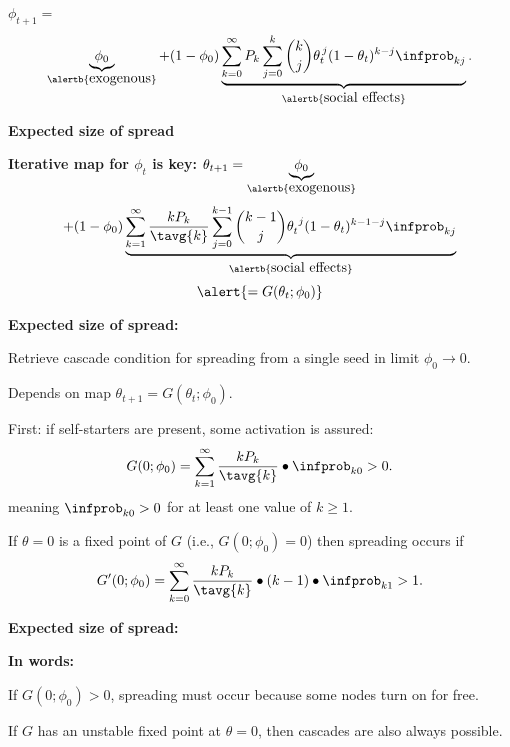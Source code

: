 {{{{      $ 
      \phi_{t+1}
      = 
      $
      $$
      \underbrace{\phi_0}_{\alertb{\mbox{exogenous}}} 
      + 
      (1-\phi_{0})
      \underbrace{
      \sum_{k=0}^{\infty}
      P_k
      \sum_{j=0}^{k}
      \binom{k}{j}
      \theta_t^{\, j}
      (1-\theta_t)^{k-j} 
      \infprob_{kj}
      }_{\alertb{\mbox{social effects}}}.
      $$
    
  


  \textbf{Expected size of spread}
  
  \textbf{Iterative map for $\phi_t$ is key:}
      $
      \theta_{t+1}
      =
      \underbrace{\phi_0}_{\alertb{\mbox{exogenous}}} 
      $
      $$
      +
      (1-\phi_0)
      \underbrace{
      \sum_{k=1}^{\infty}
      \frac{k P_k}{\tavg{k}}
      \sum_{j=0}^{k-1}
      \binom{k-1}{j}
      \theta_{t}^{\ j}
      (1-\theta_{t})^{k-1-j}
      \infprob_{kj}
      }_{\alertb{\mbox{social effects}}}
      $$
      $$
      \alert{= G(\theta_t;\phi_0)}
      $$
  



  \textbf{Expected size of spread:}

  
    
    
      Retrieve cascade condition for 
      spreading from a single seed in limit $\phi_0 \rightarrow 0$.
     
      Depends on map $\theta_{t+1} = G(\theta_{t};\phi_0)$.
     
      First: if self-starters are present, some activation is assured:
      $$
      G(0;\phi_0) = 
      \sum_{k=1}^{\infty} 
      \frac{kP_k}{\tavg{k}}
      \bullet
      \infprob_{k0} > 0.
      $$
      meaning $\infprob_{k0}>0$ for at least one value of $k \ge 1$.
     
      If $\theta=0$ is a fixed point of $G$ (i.e., $G(0;\phi_0) = 0$)
      then spreading occurs if
      $$
      G'(0;\phi_0) = 
      \sum_{k=0}^{\infty} 
      \frac{k P_k}{\tavg{k}}
      \bullet
      (k-1) 
      \bullet
      \infprob_{k1} > 1.
      $$
    
  


  \textbf{Expected size of spread:}

  \textbf{In words:}    
    
     
      If $G(0;\phi_0) > 0$, spreading must occur because
      some nodes turn on for free.
     
      If $G$ has an \alert{unstable fixed point} at $\theta = 0$,
      then cascades are also always possible.
    
}}}}

